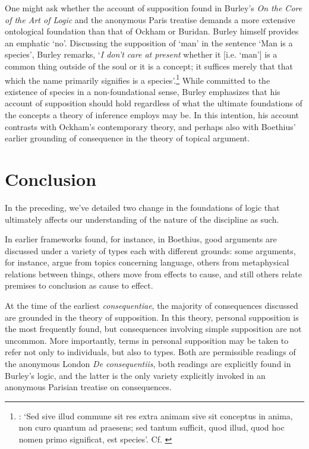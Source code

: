 \documentclass[a4paper, 11pt]{article}
\begin{document}
One might ask whether the account of supposition found in Burley's \emph{On the Core of the Art of Logic} and the anonymous Paris treatise demands a more extensive ontological foundation than that of Ockham or Buridan. Burley himself provides an emphatic `no'. Discussing the supposition of `man' in the sentence `Man is a species', Burley remarks, `\emph{I don't care at present} whether it [i.e. `man'] is a common thing outside of the soul or it is a concept; it suffices merely that that which the name primarily signifies is a species'.\footnote{\autocite[8.8-10]{BurleyDPAL}: `Sed sive illud commune sit res extra animam sive sit conceptus in anima, non curo quantum ad praesens; sed tantum sufficit, quod illud, quod hoc nomen primo significat, est species'. Cf. \autocite[196.33-37]{OckhamSL}} While committed to the existence of species in a non-foundational sense, Burley emphasizes that his account of supposition should hold regardless of what the ultimate foundations of the concepts a theory of inference employs may be. In this intention, his account contrasts with Ockham's contemporary theory, and perhaps also with Boethius' earlier grounding of consequence in the theory of topical argument.
\section{Conclusion}
In the preceding, we've detailed two change in the foundations of logic that ultimately affects our understanding of the nature of the discipline as such. 

In earlier frameworks found, for instance, in Boethius, good arguments are discussed under a variety of types each with different grounds: some arguments, for instance, argue from topics concerning language, others from metaphysical relations between things, others move from effects to cause, and still others relate premises to conclusion as cause to effect.

At the time of the earliest \emph{consequentiae}, the majority of consequences discussed are grounded in the theory of supposition. In this theory, personal supposition is the most frequently found, but consequences involving simple supposition are not uncommon. More importantly, terms in personal supposition may be taken to refer not only to individuals, but also to types. Both are permissible readings of the anonymous London \emph{De consequentiis}, both readings are explicitly found in Burley's logic, and the latter is the only variety explicitly invoked in an anonymous Parisian treatise on consequences.
\end{document}
